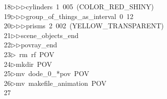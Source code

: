 \begin{tabbing}
18\>$\triangleright$\>$\triangleright$\>$\triangleright$\>cylinders\ 1\ 005\ (COLOR\_RED\_SHINY)\ \\[0pt]
19\>$\triangleright$\>$\triangleright$\>$\triangleright$\>group\_of\_things\_as\_interval\ 0\ 12\\[0pt]
20\>$\triangleright$\>$\triangleright$\>$\triangleright$\>prisms\ 2\ 002\ (YELLOW\_TRANSPARENT)\ \\[0pt]
21\>$\triangleright$\>$\triangleright$\>scene\_objects\_end\ \\[0pt]
22\>$\triangleright$\>$\triangleright$\>povray\_end\\[0pt]
23\>$\triangleright$\>\ rm\ rf\ POV\\[0pt]
24\>$\triangleright$\>mkdir\ POV\\[0pt]
25\>$\triangleright$\>mv\ dode\_0\_*pov\ POV\\[0pt]
26\>$\triangleright$\>mv\ makefile\_animation\ POV\\[0pt]
27\>\end{tabbing}
